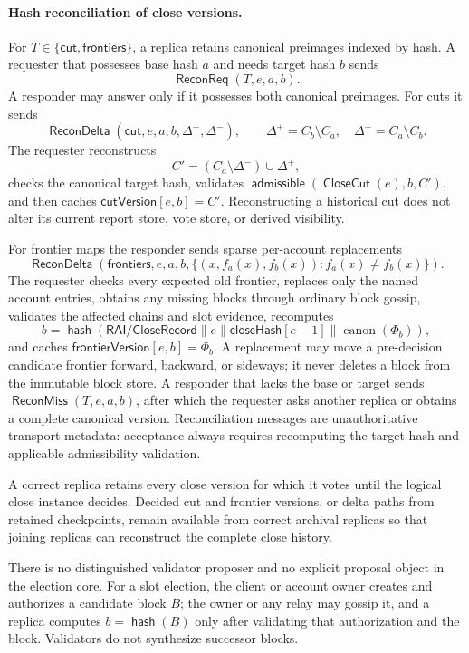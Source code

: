 \documentclass[sigplan,twocolumn,review,anonymous]{acmart}
\newcommand{\func}[1]{\operatorname{\mathsf{#1}}}
\newcommand{\hash}{\func{hash}}
\newcommand{\CloseCut}{\func{CloseCut}}
\newcommand{\admissible}{\func{admissible}}
\newcommand{\closeHash}{\mathsf{closeHash}}
\newcommand{\cutVersion}{\mathsf{cutVersion}}
\newcommand{\frontierVersion}{\mathsf{frontierVersion}}
\newcommand{\ReconReq}{\func{ReconReq}}
\newcommand{\ReconDelta}{\func{ReconDelta}}
\newcommand{\ReconMiss}{\func{ReconMiss}}
\begin{document}
\paragraph{Hash reconciliation of close versions.}
For \(T\in\{\mathsf{cut},\mathsf{frontiers}\}\), a replica retains canonical preimages indexed by
hash.  A requester that possesses base hash \(a\) and needs target hash \(b\) sends
\[
\ReconReq(T,e,a,b).
\]
A responder may answer only if it possesses both canonical preimages.  For cuts it sends
\[
\ReconDelta(\mathsf{cut},e,a,b,\Delta^+,\Delta^-),
\qquad
\Delta^+=C_b\setminus C_a,
\quad
\Delta^-=C_a\setminus C_b.
\]
The requester reconstructs
\[
C'=(C_a\setminus\Delta^-)\cup\Delta^+,
\]
checks the canonical target hash, validates \(\admissible(\CloseCut(e),b,C')\), and then caches
\(\cutVersion[e,b]=C'\).  Reconstructing a historical cut does not alter its current report store, vote store, or derived visibility.

For frontier maps the responder sends sparse per-account replacements
\[
\ReconDelta(\mathsf{frontiers},e,a,b,
\{(x,f_a(x),f_b(x)):f_a(x)\neq f_b(x)\}).
\]
The requester checks every expected old frontier, replaces only the named account entries, obtains any
missing blocks through ordinary block gossip, validates the affected chains and slot evidence, recomputes
\[
b=\hash(\mathsf{RAI/CloseRecord}\parallel e\parallel\closeHash[e-1]
\parallel\operatorname{canon}(\Phi_b)),
\]
and caches \(\frontierVersion[e,b]=\Phi_b\).  A replacement may move a pre-decision candidate frontier
forward, backward, or sideways; it never deletes a block from the immutable block store.  A responder
that lacks the base or target sends \(\ReconMiss(T,e,a,b)\), after which the requester asks another
replica or obtains a complete canonical version.  Reconciliation messages are unauthoritative transport
metadata: acceptance always requires recomputing the target hash and applicable admissibility validation.

A correct replica retains every close version for which it votes until the logical close instance
decides.  Decided cut and frontier versions, or delta paths from retained checkpoints, remain available
from correct archival replicas so that joining replicas can reconstruct the complete close history.

There is no distinguished validator proposer and no explicit proposal object in the election core.
For a slot election, the client or account owner creates and authorizes a candidate block \(B\); the
owner or any relay may gossip it, and a replica computes \(b=\hash(B)\) only after validating that
authorization and the block.  Validators do not synthesize successor blocks.
\end{document}
